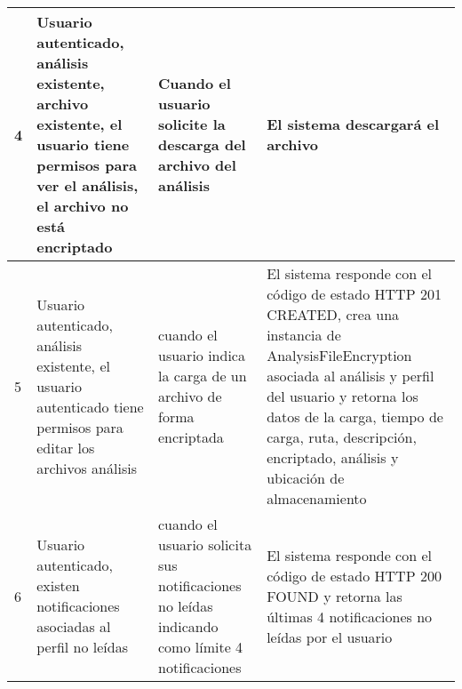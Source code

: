 \begin{center}
\begin{longtable}{|p{0.5cm}|p{4cm}|p{4cm}|p{4.5cm}| }
4& Usuario autenticado, análisis existente, archivo existente, el usuario tiene permisos para ver el análisis, el archivo no está encriptado & Cuando el usuario solicite la descarga del archivo del análisis & El sistema descargará el archivo\\ \hline

5& Usuario autenticado, análisis existente, el usuario autenticado tiene permisos para editar los archivos análisis & cuando el usuario indica la carga de un archivo de forma encriptada & El sistema responde con el código de estado HTTP 201 CREATED, crea una instancia de AnalysisFileEncryption asociada al análisis y perfil del usuario y retorna los datos de la carga, tiempo de carga, ruta, descripción, encriptado, análisis y ubicación de almacenamiento\\ \hline

6& Usuario autenticado, existen notificaciones asociadas al perfil no leídas & cuando el usuario solicita sus notificaciones no leídas indicando como límite 4 notificaciones & El sistema responde con el código de estado HTTP 200 FOUND y retorna las últimas 4 notificaciones no leídas por el usuario\\ \hline


  \end{longtable}
\end{center}






